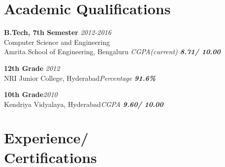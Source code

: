 \documentclass[margin]{res}
\begin{document}
 

\address{\Large {\bf{Sricharan Chiruvolu}}\\[10pt]{\sl (+91) 9035 886166 } \\ {\sl \underline{sricharanized@gmail.com}}
        }
\address{Mathura block \\ Amrita School of Engineering  \\
         Kasavanahalli, Carmelaram P.O.\\ Bengaluru, India - 560035}
 
\begin{resume}

	

\section{Academic Qualifications}
{\bf B.Tech, 7th Semester} {\sl \hfill 2012-2016}
 \\Computer Science and Engineering\\ Amrita School of Engineering, Bengaluru {\sl \hfill CGPA(current) {\bf 8.71/ 10.00}}

{\bf 12th Grade} {\sl \hfill 2012}
\\NRI Junior College, Hyderabad{\sl \hfill Percentage {\bf 91.6\% }}

{\bf 10th Grade}{\sl \hfill 2010}
 \\ Kendriya Vidyalaya, Hyderabad{\sl \hfill CGPA {\bf 9.60/ 10.00}}


\section{Experience/ \\ Certifications}
	

\end{resume}
\end{document}
